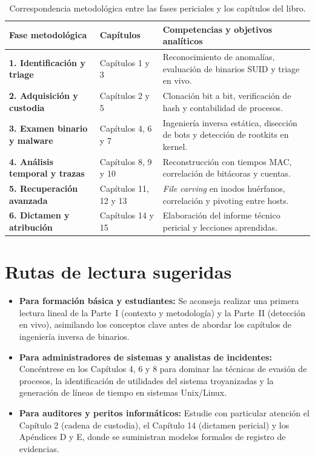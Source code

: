 \begin{table}[htbp]
\centering
\small
\begin{tabularx}{\textwidth}{@{} p{3.8cm} p{2.6cm} X @{}}
\toprule
\textbf{Fase metodológica} & \textbf{Capítulos} & \textbf{Competencias y objetivos analíticos} \\
\midrule
\textbf{1. Identificación y triage} & Capítulos 1 y 3 & Reconocimiento de anomalías, evaluación de binarios SUID y triage en vivo. \\
\addlinespace
\textbf{2. Adquisición y custodia} & Capítulos 2 y 5 & Clonación bit a bit, verificación de hash y contabilidad de procesos. \\
\addlinespace
\textbf{3. Examen binario y malware} & Capítulos 4, 6 y 7 & Ingeniería inversa estática, disección de bots y detección de rootkits en kernel. \\
\addlinespace
\textbf{4. Análisis temporal y trazas} & Capítulos 8, 9 y 10 & Reconstrucción con tiempos MAC, correlación de bitácoras y cuentas. \\
\addlinespace
\textbf{5. Recuperación avanzada} & Capítulos 11, 12 y 13 & \textit{File carving} en inodos huérfanos, correlación y pivoting entre hosts. \\
\addlinespace
\textbf{6. Dictamen y atribución} & Capítulos 14 y 15 & Elaboración del informe técnico pericial y lecciones aprendidas. \\
\bottomrule
\end{tabularx}
\caption{Correspondencia metodológica entre las fases periciales y los capítulos del libro.}
\label{tab:matriz_nist}
\end{table}

\section*{Rutas de lectura sugeridas}

\begin{itemize}
    \item \textbf{Para formación básica y estudiantes:} Se aconseja realizar una primera lectura lineal de la Parte~I (contexto y metodología) y la Parte~II (detección en vivo), asimilando los conceptos clave antes de abordar los capítulos de ingeniería inversa de binarios.
    \item \textbf{Para administradores de sistemas y analistas de incidentes:} Concéntrese en los Capítulos 4, 6 y 8 para dominar las técnicas de evasión de procesos, la identificación de utilidades del sistema troyanizadas y la generación de líneas de tiempo en sistemas Unix/Linux.
    \item \textbf{Para auditores y peritos informáticos:} Estudie con particular atención el Capítulo 2 (cadena de custodia), el Capítulo 14 (dictamen pericial) y los Apéndices D y E, donde se suministran modelos formales de registro de evidencias.
\end{itemize}
